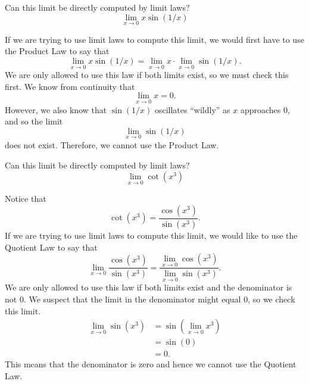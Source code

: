 \documentclass{ximera}
\begin{document}
\begin{question}
  Can this limit be directly computed by limit laws?
  \[
  \lim_{x\to 0} x\sin(1/x)
  \]
  \begin{prompt}
  \begin{multipleChoice}
  \end{multipleChoice}
  \begin{feedback}
    If we are trying to use limit laws to compute this limit, we would
    first have to use the Product Law to say that
    \[
    \lim_{x\to 0}x\sin(1/x)= \lim_{x\to 0} x \cdot \lim_{x\to 0} \sin(1/x).
    \]
    We are only allowed to use this law if both limits exist, so we
    must check this first.  We know from continuity that
    \[
    \lim_{x\to  0}x=0.
    \]
    However, we also know that $\sin(1/x)$ oscillates ``wildly'' as
    $x$ approaches $0$, and so the limit
    \[
    \lim_{x\to 0} \sin(1/x)
    \]does not exist.  Therefore, we cannot use the
    Product Law.
  \end{feedback}
  \end{prompt}
\end{question}


\begin{question}
  Can this limit be directly computed by limit laws?
  \[
  \lim_{x\to 0} \cot(x^3)
  \]
  \begin{prompt}
  \begin{multipleChoice}
  \end{multipleChoice}
  \begin{feedback}
    Notice that
    \[
    \cot(x^3) = \frac{\cos(x^3)}{\sin(x^3)}.
    \]
    If we are trying to use limit laws to compute this limit, we would
    like to use the Quotient Law to say that
    \[
    \lim_{x\to 0} \frac{\cos(x^3)}{\sin(x^3)} = \frac{\lim_{x\to 0}
      \cos(x^3)}{\lim_{x\to 0} \sin(x^3)}.
    \]
    We are only allowed to use this law if both limits exist and the
    denominator is not $0$. We suspect that the limit in the
    denominator might equal $0$, so we check this limit.
    \begin{align*}
      \lim_{x\to 0} \sin(x^3) &= \sin(\lim_{x\to 0}x^3)\\
      &=\sin(0) \\
      &=0.
  \end{align*}
  This means that the denominator is zero and hence we cannot use the
  Quotient Law.
  \end{feedback}
  \end{prompt}
\end{question}
\end{document}
